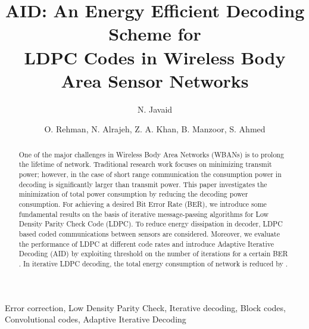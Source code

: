 \documentclass[3p,times,procedia]{elsarticle}
\begin{document}
\begin{frontmatter}

\author{N. Javaid}


\title{AID: An Energy Efficient Decoding Scheme for\\ LDPC Codes in Wireless Body Area Sensor Networks}

\author{O. Rehman, N. Alrajeh, Z. A. Khan, B. Manzoor, S. Ahmed}

\address{COMSATS Institute of Information Technology, Islamabad, Pakistan. \\
        B.M.T., C.A.M.S., King Saud University, Riyadh, Saudi Arabia.\\
        Faculty of Engineering, Dalhousie University, Halifax, Canada.\\
        Abasyn University Peshawar, Pakistan.\\
}

\begin{abstract}
One of the major challenges in Wireless Body Area Networks (WBANs) is to prolong the lifetime of network. Traditional research work focuses on minimizing transmit power; however, in the case of short range communication the consumption power in decoding is significantly larger than transmit power. This paper investigates the minimization of total power consumption by reducing the decoding power consumption. For achieving a desired Bit Error Rate (BER), we introduce some fundamental results on the basis of iterative message-passing algorithms for Low Density Parity Check Code (LDPC). To reduce energy dissipation in decoder, LDPC based coded communications between sensors are considered. Moreover, we evaluate the performance of LDPC at different code rates and introduce Adaptive Iterative Decoding (AID) by exploiting threshold on the number of iterations for a certain BER . In iterative LDPC decoding, the total energy consumption of network is reduced by .
\end{abstract}

\begin{keyword}
Error correction, Low Density Parity Check, Iterative decoding, Block codes, Convolutional codes, Adaptive Iterative Decoding
\end{keyword}

\end{frontmatter}
\end{document}
